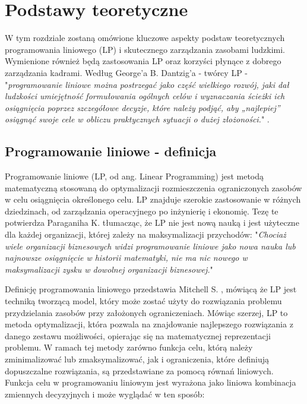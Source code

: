 \chapter{Podstawy teoretyczne}
\par W tym rozdziale zostaną omówione kluczowe aspekty podstaw teoretycznych programowania liniowego (LP) i skutecznego zarządzania zasobami ludzkimi. Wymienione również będą zastosowania LP oraz korzyści płynące z dobrego zarządzania kadrami. Według George'a B. Dantzig'a - twórcy LP - "\textit{programowanie liniowe można postrzegać jako część wielkiego rozwój, jaki dał ludzkości umiejętność formułowania ogólnych celów i wyznaczania ścieżki ich osiągnięcia poprzez szczegółowe decyzje, które należy podjąć, aby „najlepiej” osiągnąć swoje cele w obliczu praktycznych sytuacji o dużej złożoności.}" \parencite{dantzig2002linear}.

\section{Programowanie liniowe - definicja}
\par Programowanie liniowe (LP, od ang. Linear Programming) jest metodą matematyczną stosowaną do optymalizacji rozmieszczenia ograniczonych zasobów w celu osiągnięcia określonego celu. LP znajduje szerokie zastosowanie w różnych dziedzinach, od zarządzania operacyjnego po inżynierię i ekonomię. Tezę te potwierdza Paraganiha K. \parencite{parganiha2018linear} tłumacząc, że LP nie jest nową nauką i jest użyteczne dla każdej organizacji, której zależy na maksymalizacji przychodów: "\textit{Chociaż wiele organizacji biznesowych widzi programowanie liniowe jako nowa nauka lub najnowsze osiągnięcie w historii matematyki, nie ma nic nowego w maksymalizacji zysku w dowolnej organizacji biznesowej.}"
    
\par Definicję programowania liniowego przedstawia Mitchell S. \parencite{pratomoatmojo2020brief}, mówiącą że LP jest techniką tworzącą model, który może zostać użyty do rozwiązania problemu przydzielania zasobów przy założonych ograniczeniach. Mówiąc szerzej, LP to metoda optymalizacji, która pozwala na znajdowanie najlepszego rozwiązania z danego zestawu możliwości, opierając się na matematycznej reprezentacji problemu. W ramach tej metody zarówno funkcja celu, którą należy zminimalizować lub zmaksymalizować, jak i ograniczenia, które definiują dopuszczalne rozwiązania, są przedstawiane za pomocą równań liniowych. Funkcja celu w programowaniu liniowym jest wyrażona jako liniowa kombinacja zmiennych decyzyjnych i może wyglądać w ten sposób: 

